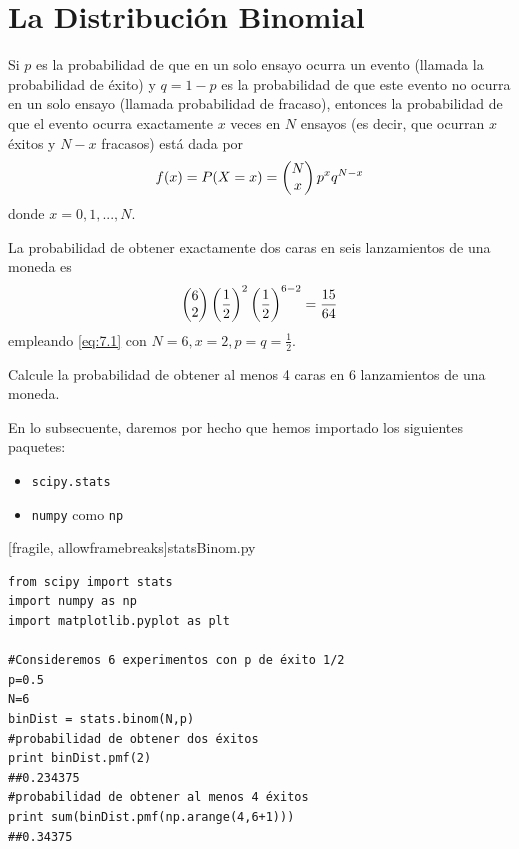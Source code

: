 
\section{La Distribución Binomial}


 Si $p$ es la probabilidad de que en un solo ensayo ocurra un evento (llamada la probabilidad de éxito) y $q = 1 - p$ es la
probabilidad de que este evento no ocurra en un solo ensayo (llamada probabilidad de fracaso), entonces la probabilidad de que el evento ocurra exactamente $x$ veces en $N$ ensayos (es decir, que ocurran $x$ éxitos y $N - x$ fracasos) está
dada por
\begin{align}
 \label{eq:7.1}
 f(x)=P(X=x)=\begin{pmatrix} N \\ x\end{pmatrix}p^{x}q^{N-x}
\end{align}
donde $x=0,1,...,N.$


 \begin{ejemplo}
  \label{exmp:7.1}
  La probabilidad de obtener exactamente dos caras en seis lanzamientos de una moneda es
  \begin{align*}
   \begin{pmatrix} 6 \\ 2\end{pmatrix}\left( \dfrac{1}{2} \right)^{2}\left( \dfrac{1}{2} \right)^{6-2}=\dfrac{15}{64}
  \end{align*}
empleando \eqref{eq:7.1} con $N=6, x=2, p=q=\frac{1}{2}.$
 \end{ejemplo}



\begin{ejemplo}
 \label{exmp:7.2}
 Calcule la probabilidad de obtener al menos 4 caras en 6 lanzamientos de una moneda.
\end{ejemplo}



 En lo subsecuente, daremos por hecho que hemos importado los siguientes paquetes:
 \begin{itemize}
  \item \texttt{scipy.stats}
  \item \texttt{numpy} como \texttt{np}
 \end{itemize}


[fragile, allowframebreaks]{statsBinom.py}
\begin{verbatim}
from scipy import stats
import numpy as np
import matplotlib.pyplot as plt

#Consideremos 6 experimentos con p de éxito 1/2
p=0.5
N=6
binDist = stats.binom(N,p)
#probabilidad de obtener dos éxitos
print binDist.pmf(2)
##0.234375
#probabilidad de obtener al menos 4 éxitos
print sum(binDist.pmf(np.arange(4,6+1)))
##0.34375
 \end{verbatim}


